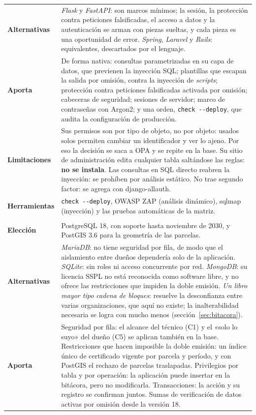 \documentclass[11pt,letterpaper]{article}
\newcommand{\cab}[1]{\textbf{\rmfamily #1}}
\newcommand{\cod}[1]{\texttt{#1}}
\newcommand{\fila}[1]{\textrm{\bfseries #1}}
\begin{document}
{\begin{longtable}{@{}L{2.4cm} L{13.5cm}@{}}
\fila{Alternativas} & \emph{Flask} y \emph{FastAPI}: son marcos mínimos; la sesión, la protección contra peticiones falsificadas, el acceso a datos y la autenticación se arman con piezas sueltas, y cada pieza es una oportunidad de error. \emph{Spring}, \emph{Laravel} y \emph{Rails}: equivalentes, descartados por el lenguaje. \\
\fila{Aporta} & De forma nativa: consultas parametrizadas en su capa de datos, que previenen la inyección SQL; plantillas que escapan la salida por omisión, contra la inyección de \emph{scripts}; protección contra peticiones falsificadas activada por omisión; cabeceras de seguridad; sesiones de servidor; marco de contraseñas con Argon2; y una orden, \cod{check -{}-deploy}, que audita la configuración de producción. \\
\fila{Limitaciones} & Sus permisos son por tipo de objeto, no por objeto: usados solos permiten cambiar un identificador y ver lo ajeno. Por eso la decisión se saca a OPA y se repite en la base. Su sitio de administración edita cualquier tabla saltándose las reglas: \textbf{no se instala}. Las consultas en SQL directo reabren la inyección: se prohíben por análisis estático. No trae segundo factor: se agrega con django-allauth. \\
\fila{Herramientas} & \cod{check -{}-deploy}, OWASP ZAP (análisis dinámico), sqlmap (inyección) y las pruebas automáticas de la matriz. \\
\bottomrule
\addlinespace[0.8em]
\toprule
\multicolumn{2}{@{}l}{\cab{Base de datos: PostgreSQL 18 con PostGIS 3.6}} \\
\midrule
\fila{Elección} & PostgreSQL 18, con soporte hasta noviembre de 2030, y PostGIS 3.6 para la geometría de las parcelas. \\
\fila{Alternativas} & \emph{MariaDB}: no tiene seguridad por fila, de modo que el aislamiento entre dueños dependería solo de la aplicación. \emph{SQLite}: sin roles ni acceso concurrente por red. \emph{MongoDB}: su licencia SSPL no está reconocida como software libre, y no ofrece las restricciones que impiden la doble emisión. \emph{Un libro mayor tipo cadena de bloques}: resuelve la desconfianza entre varias organizaciones, que aquí no existe; la inalterabilidad necesaria se logra con mucho menos (sección~\ref{sec:bitacora}). \\
\fila{Aporta} & Seguridad por fila: el alcance del técnico (C1) y el «solo lo suyo» del dueño (C5) se aplican también en la base. Restricciones que hacen imposible la doble emisión: un índice único de certificado vigente por parcela y período, y con PostGIS el rechazo de parcelas traslapadas. Privilegios por tabla y por operación: la aplicación puede insertar en la bitácora, pero no modificarla. Transacciones: la acción y su registro se confirman juntos. Sumas de verificación de datos activas por omisión desde la versión 18. \\

\end{longtable}}
\end{document}

